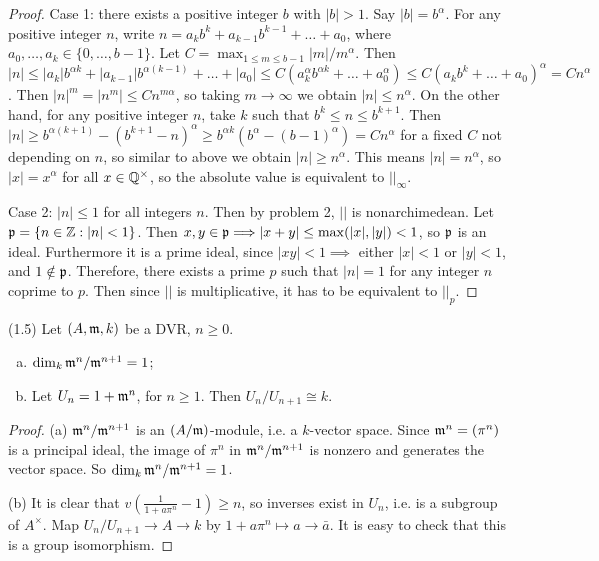 \documentclass[11pt]{amsart}
\begin{document}
\begin{proof}
Case 1: there exists a positive integer $b$ with $|b| > 1$. Say $|b| = b^{\alpha}$. For any positive integer $n$, write $n = a_k b^k + a_{k-1}b^{k-1} + \dots + a_0$, where $a_0,\dots,a_k \in \{0,\dots, b-1\}$. Let $C = \max_{1\le m \le b-1} |m|/m^{\alpha}$. Then $|n|\le |a_k|b^{\alpha k} + |a_{k-1}|b^{\alpha(k-1)} + \dots + |a_0|\le C (a_k^{\alpha} b^{\alpha k} + \dots + a_0^{\alpha}) \le C(a_kb^k + \dots + a_0)^{\alpha} = Cn^{\alpha}$. Then $|n|^m = |n^m| \le Cn^{m\alpha}$, so taking $m\to\infty$ we obtain $|n|\le n^{\alpha}$. On the other hand, for any positive integer $n$, take $k$ such that $b^k \le n\le b^{k+1}$. Then $|n|\ge b^{\alpha(k+1)} - (b^{k+1}-n)^{\alpha} \ge b^{\alpha k}(b^{\alpha} - (b-1)^{\alpha}) = Cn^{\alpha}$ for a fixed $C$ not depending on $n$, so similar to above we obtain $|n| \ge n^{\alpha}$. This means $|n| = n^{\alpha}$, so $|x| = x^{\alpha}$ for all $x\in \mathbb{Q}^{\times}$, so the absolute value is equivalent to $||_{\infty}$.

Case 2: $|n|\le 1$ for all integers $n$. Then by problem 2, $||$ is nonarchimedean. Let $\mathfrak{p} = \{n\in\mathbb{Z}: |n|<1\}$. Then $x,y\in \mathfrak{p} \Longrightarrow |x+y| \le \max(|x|,|y|) < 1$, so $\mathfrak{p}$ is an ideal. Furthermore it is a prime ideal, since $|xy| < 1 \implies$ either $|x|<1$ or $|y|<1$, and $1\notin \mathfrak{p}$. Therefore, there exists a prime $p$ such that $|n| = 1$ for any integer $n$ coprime to $p$. Then since $||$ is multiplicative, it has to be equivalent to $||_p$.
\end{proof}

(1.5)
Let $(A,\mathfrak{m},k)$ be a DVR, $n\ge 0$. 
\begin{enumerate}[(a)]
    \item $\dim_k\mathfrak{m}^n/\mathfrak{m}^{n+1} = 1$;
    \item Let $U_n = 1 + \mathfrak{m}^n$, for $n\ge 1$. Then $U_n/U_{n+1}\cong k$.
\end{enumerate}

\begin{proof}
(a) $\mathfrak{m}^n/\mathfrak{m}^{n+1}$ is an $(A/\mathfrak{m})$-module, i.e. a $k$-vector space. Since $\mathfrak{m}^n = (\pi^n)$ is a principal ideal, the image of $\pi^n$ in $\mathfrak{m}^n/\mathfrak{m}^{n+1}$ is nonzero and generates the vector space. So $\dim_k \mathfrak{m}^n/\mathfrak{m}^{n+1} = 1$.

(b) It is clear that $v(\frac{1}{1+a\pi^n} - 1) \ge n$, so inverses exist in $U_n$, i.e. is a subgroup of $A^\times$. Map $U_n/U_{n+1} \to A\to k$ by $1+a\pi^n \mapsto a \to \bar{a}$. It is easy to check that this is a group isomorphism.
\end{proof}
\end{document}
